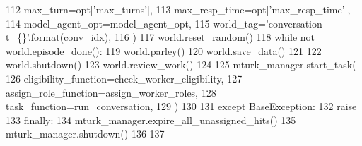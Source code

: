 \begin{DoxyCode}
112                 max\_turn=opt[\textcolor{stringliteral}{'max\_turns'}],
113                 max\_resp\_time=opt[\textcolor{stringliteral}{'max\_resp\_time'}],
114                 model\_agent\_opt=model\_agent\_opt,
115                 world\_tag=\textcolor{stringliteral}{'conversation t\_\{\}'}.\hyperlink{namespaceparlai_1_1chat__service_1_1services_1_1messenger_1_1shared__utils_a32e2e2022b824fbaf80c747160b52a76}{format}(conv\_idx),
116             )
117             world.reset\_random()
118             \textcolor{keywordflow}{while} \textcolor{keywordflow}{not} world.episode\_done():
119                 world.parley()
120             world.save\_data()
121 
122             world.shutdown()
123             world.review\_work()
124 
125         mturk\_manager.start\_task(
126             eligibility\_function=check\_worker\_eligibility,
127             assign\_role\_function=assign\_worker\_roles,
128             task\_function=run\_conversation,
129         )
130 
131     \textcolor{keywordflow}{except} BaseException:
132         \textcolor{keywordflow}{raise}
133     \textcolor{keywordflow}{finally}:
134         mturk\_manager.expire\_all\_unassigned\_hits()
135         mturk\_manager.shutdown()
136 
137 
\end{DoxyCode}
